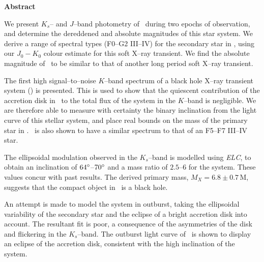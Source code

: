 
\begin{center}
\Large{\textbf{Abstract}}
\end{center}

\vspace{\myparskip}

We present $K_s$-- and $J$--band photometry of \groj\ during two epochs
of observation, and determine the dereddened and absolute magnitudes
of this star system. We derive a range of spectral types (F0--G2 III--IV) for the secondary star
in \groj, using our $J_{0}-K_{0}$ colour estimate for this soft X--ray transient. We find the absolute
magnitude of \groj\ to be similar to that of another long period soft
X--ray transient. %

\vspace{\myparskip}

The first high signal--to--noise $K$--band spectrum of a black hole X--ray
transient system (\groj) is presented. This is used to show that the quiescent contribution of the accretion disk in \groj\
to the total flux of the system in the $K$--band is negligible. We are
therefore able to measure with certainty the binary inclination from the light curve of this stellar system, and place real bounds on the mass of the primary star in \groj. \groj\ is also shown to have
a similar spectrum to that of an F5--F7 III--IV star. %

\vspace{\myparskip}

The ellipsoidal modulation observed in the $K_s$--band is modelled
using \textit{ELC}, to obtain an inclination of $64\hbox{$^\circ$}$--$70\hbox{$^\circ$}$ and a mass ratio of $2.5$--$6$ for the system. These values concur with past results. The derived primary mass, $M_X =
6.8\pm0.7$\,M\sun, suggests that the compact object in \groj\ is a black
hole. %

\vspace{\myparskip}

An attempt is made to model the system in outburst, taking the
ellipsoidal variability of the secondary star and the eclipse of a bright
accretion disk into account. The resultant fit is poor, a consequence
of the asymmetries of the disk and flickering in the $K_s$--band. The
outburst light curve of \groj\ is shown to display an eclipse of the
accretion disk, consistent with the high inclination of the system. %

